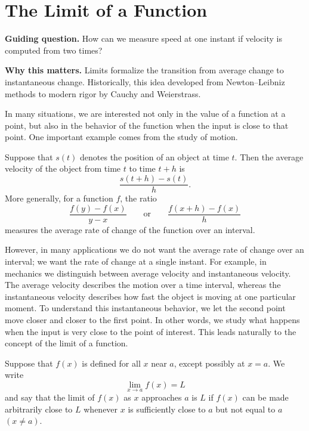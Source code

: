 \section{The Limit of a Function}

\begin{remark}
\textbf{Guiding question.} How can we measure speed at one instant if velocity is computed from two times?

\textbf{Why this matters.} Limits formalize the transition from average change to instantaneous change. Historically, this idea developed from Newton--Leibniz methods to modern rigor by Cauchy and Weierstrass.
\end{remark}

In many situations, we are interested not only in the value of a function at a point, but also in the behavior of the function when the input is close to that point. One important example comes from the study of motion.

Suppose that \(s(t)\) denotes the position of an object at time \(t\). Then the average velocity of the object from time \(t\) to time \(t+h\) is
\[
\frac{s(t+h)-s(t)}{h}.
\]
More generally, for a function \(f\), the ratio
\[
\frac{f(y)-f(x)}{y-x}
\qquad \text{or} \qquad
\frac{f(x+h)-f(x)}{h}
\]
measures the average rate of change of the function over an interval.

However, in many applications we do not want the average rate of change over an interval; we want the rate of change at a single instant. For example, in mechanics we distinguish between average velocity and instantaneous velocity. The average velocity describes the motion over a time interval, whereas the instantaneous velocity describes how fast the object is moving at one particular moment. To understand this instantaneous behavior, we let the second point move closer and closer to the first point. In other words, we study what happens when the input is very close to the point of interest. This leads naturally to the concept of the limit of a function.

\begin{definition}
Suppose that \(f(x)\) is defined for all \(x\) near \(a\), except possibly at \(x=a\). We write
\[
\lim_{x\to a} f(x)=L
\]
and say that the limit of \(f(x)\) as \(x\) approaches \(a\) is \(L\) if \(f(x)\) can be made arbitrarily close to \(L\) whenever \(x\) is sufficiently close to \(a\) but not equal to \(a\) \((x\ne a)\).
\end{definition}

